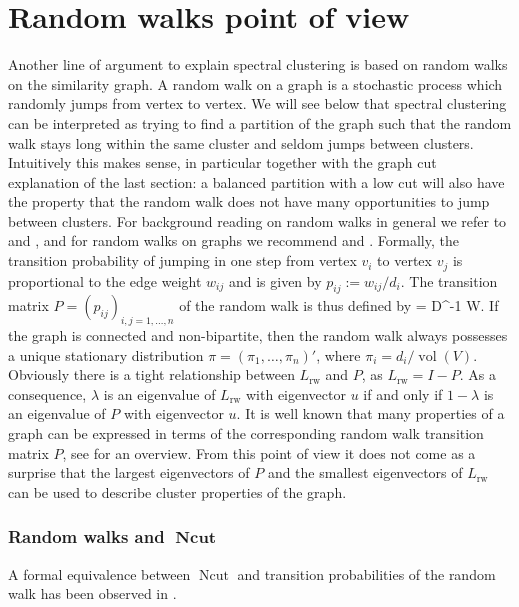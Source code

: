 \documentclass{article}
\def\ba#1\ea{\begin{align*}#1\end{align*}} %
\DeclareMathOperator{\vol}{vol} %
\newcommand{\Lrw}{L_{\text{rw}}}
\DeclareMathOperator{\Ncut}{Ncut}
\begin{document}
%
\section{Random walks point of view} \label{sec-rw}
%

Another line of argument to explain spectral clustering is based on
random walks on the similarity graph. A random walk on a graph is a
stochastic process which randomly jumps from vertex to vertex.  We
will see below that spectral clustering can be interpreted as trying
to find a partition of the graph such that the random walk stays long
within the same cluster and seldom jumps between clusters. Intuitively
this makes sense, in particular together with the graph cut
explanation of the last section: a balanced partition with a low cut
will also have the property that the random walk does not have many
opportunities to jump between clusters. For background reading on random walks in general we
refer to  and , and for random walks on
graphs we recommend  and . 
%
Formally, the transition probability of jumping in one step from vertex $v_i$ to
vertex $v_j$ is proportional to the edge weight $w_{ij}$ and  is
given by $p_{ij}:= w_{ij}/d_i$. The transition matrix $P =
(p_{ij})_{i,j=1,\hdots,n}$ of the random
walk is thus defined by
%
\ba
P = D^{-1} W.
\ea
%
If the graph is connected and non-bipartite,
then the random walk always possesses a unique stationary distribution
$\pi = (\pi_1, \hdots, \pi_n)'$, where $\pi_i =
d_i/\vol(V)$.  
%
Obviously there is a tight relationship between $\Lrw$ and $P$, as
$\Lrw = I - P$.  As a consequence, $\lambda$ is an eigenvalue of
$\Lrw$ with eigenvector $u$ if and only if $1 - \lambda$ is an
eigenvalue of $P$ with eigenvector $u$.  It is well known that many
properties of a graph can be expressed in terms of the corresponding
random walk transition matrix $P$, see  for an
overview. From this point of view it does not come as a surprise that
the largest eigenvectors of $P$ and the smallest eigenvectors of
$\Lrw$ can be used to describe cluster properties of the graph.

%
\subsubsection*{Random walks and $\boldsymbol{\Ncut}$}
%


A formal equivalence between $\Ncut$ and transition probabilities of
the random walk has been observed in . 
\end{document}
